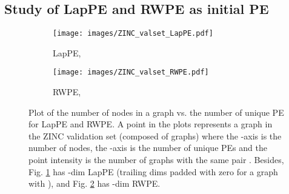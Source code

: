 \documentclass{article} \usepackage{iclr2021_conference,times}
\begin{document}
\subsection{Study of LapPE and RWPE as initial PE}
\label{sec:supplementary_unique_pe}





\begin{figure}[h]
\centering
  \begin{subfigure}{0.42\linewidth}
  \centering
    \texttt{[image: images/ZINC\_valset\_LapPE.pdf]}
    \vspace{-9pt}
    \caption{LapPE, }
    \label{fig:uniqueness_LapPE}
  \end{subfigure}
  \hspace{7pt}
  \begin{subfigure}{0.42\linewidth}
  \centering
    \texttt{[image: images/ZINC\_valset\_RWPE.pdf]}
    \vspace{-9pt}
    \caption{RWPE, }
    \label{fig:uniqueness_RWPE}
  \end{subfigure}
  \vspace{-5pt}
  \caption{Plot of the number of nodes in a graph vs. the number of unique PE for LapPE and RWPE. A point in the plots represents a graph in the ZINC validation set (composed of  graphs) where the -axis is the number of nodes, the -axis is the number of unique PEs and the point intensity is the number of graphs with the same pair . Besides, Fig. \ref{fig:uniqueness_LapPE} has -dim LapPE (trailing dims padded with zero for a graph with ), and Fig. \ref{fig:uniqueness_RWPE} has -dim RWPE.}
  \label{fig:uniqueness_PE}
\end{figure}
\end{document}
